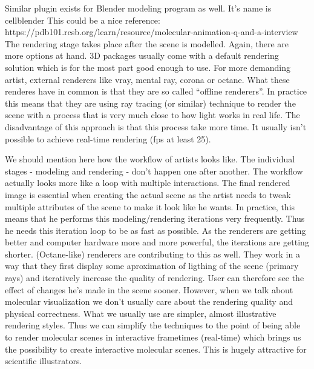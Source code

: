 \documentclass[
  digital, %
  table,   %
  lof,     %
  lot,     %
]{fithesis3}
\begin{document}
Similar plugin exists for Blender modeling program as well. It's name is cellblender
This could be a nice reference: https://pdb101.rcsb.org/learn/resource/molecular-animation-q-and-a-interview
The rendering stage takes place after the scene is modelled. Again, there are more options at hand. 3D packages usually come with a default rendering solution which is for the most part good enough to use. For more demanding artist, external renderers like vray, mental ray, corona or octane. What these renderes have in common is that they are so called ``offline renderers''. In practice this means that they are using ray tracing (or similar) technique to render the scene with a process that is very much close to how light works in real life. The disadvantage of this approach is that this process take more time. It usually isn't possible to achieve real-time rendering (fps at least 25).

We should mention here how the workflow of artists looks like. The individual stages - modeling and rendering - don't happen one after another. The workflow actually looks more like a loop with multiple interactions. The final rendered image is essential when creating the actual scene as the artist needs to tweak multiple attributes of the scene to make it look like he wants. In practice, this means that he performs this modeling/rendering iterations very frequently. Thus he needs this iteration loop to be as fast as possible. As the renderers are getting better and computer hardware more and more powerful, the iterations are getting shorter. (Octane-like) renderers are contributing to this as well. They work in a way that they first display some aproximation of ligthing of the scene (primary rays) and iteratively increase the quality of rendering. User can therefore see the effect of changes he's made in the scene sooner. However, when we talk about molecular visualization we don't usually care about the rendering quality and physical correctness. What we usually use are simpler, almost illustrative rendering styles. Thus we can simplify the techniques to the point of being able to render molecular scenes in interactive frametimes (real-time) which brings us the possibility to create interactive molecular scenes. This is hugely attractive for scientific illustrators.
\end{document}

